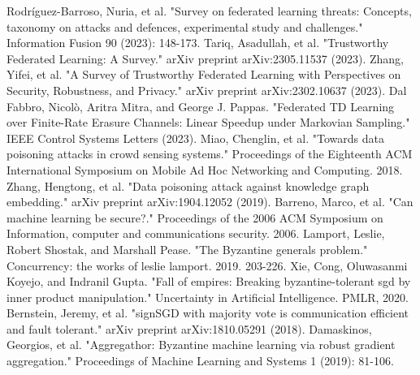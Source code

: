 \documentclass[conference]{IEEEtran}
\begin{document}
\begin{thebibliography}{00}
     Rodríguez-Barroso, Nuria, et al. "Survey on federated learning threats: Concepts, taxonomy on attacks and defences, experimental study and challenges." Information Fusion 90 (2023): 148-173.  
     Tariq, Asadullah, et al. "Trustworthy Federated Learning: A Survey." arXiv preprint arXiv:2305.11537 (2023).   
     Zhang, Yifei, et al. "A Survey of Trustworthy Federated Learning with Perspectives on Security, Robustness, and Privacy." arXiv preprint arXiv:2302.10637 (2023).  
     Dal Fabbro, Nicolò, Aritra Mitra, and George J. Pappas. "Federated TD Learning over Finite-Rate Erasure Channels: Linear Speedup under Markovian Sampling." IEEE Control Systems Letters (2023).  
     Miao, Chenglin, et al. "Towards data poisoning attacks in crowd sensing systems." Proceedings of the Eighteenth ACM International Symposium on Mobile Ad Hoc Networking and Computing. 2018.  
     Zhang, Hengtong, et al. "Data poisoning attack against knowledge graph embedding." arXiv preprint arXiv:1904.12052 (2019).   
     Barreno, Marco, et al. "Can machine learning be secure?." Proceedings of the 2006 ACM Symposium on Information, computer and communications security. 2006.  
     Lamport, Leslie, Robert Shostak, and Marshall Pease. "The Byzantine generals problem." Concurrency: the works of leslie lamport. 2019. 203-226.   
     Xie, Cong, Oluwasanmi Koyejo, and Indranil Gupta. "Fall of empires: Breaking byzantine-tolerant sgd by inner product manipulation." Uncertainty in Artificial Intelligence. PMLR, 2020.  
     Bernstein, Jeremy, et al. "signSGD with majority vote is communication efficient and fault tolerant." arXiv preprint arXiv:1810.05291 (2018).  
     Damaskinos, Georgios, et al. "Aggregathor: Byzantine machine learning via robust gradient aggregation." Proceedings of Machine Learning and Systems 1 (2019): 81-106.










\end{thebibliography}
\end{document}
